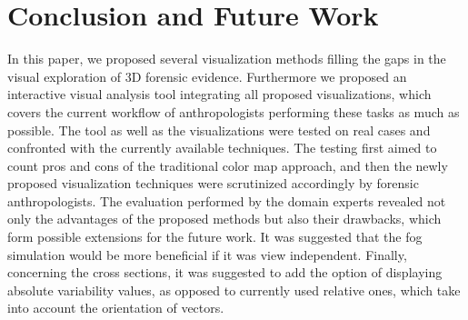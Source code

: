 \documentclass[final,5p,times]{elsarticle}
\begin{document}
\section{Conclusion and Future Work} \label{conclusion}
In this paper, we proposed several visualization methods filling the gaps in the visual exploration of 3D forensic evidence.
Furthermore we proposed an interactive visual analysis tool integrating all proposed visualizations, which covers the current workflow of anthropologists performing these tasks as much as possible.
The tool as well as the visualizations were tested on real cases and confronted with the currently available techniques. 
The testing first aimed to count pros and cons of the traditional color map approach, and then the newly proposed visualization techniques were scrutinized accordingly by forensic anthropologists. 
The evaluation performed by the domain experts revealed not only the advantages of the proposed methods but also their drawbacks, which form possible extensions for the future work. 
It was suggested that the fog simulation would be more beneficial if it was view independent. 
Finally, concerning the cross sections, it was suggested to add the option of displaying absolute variability values, as opposed to currently used relative ones, which take into account the orientation of vectors.







\end{document}

